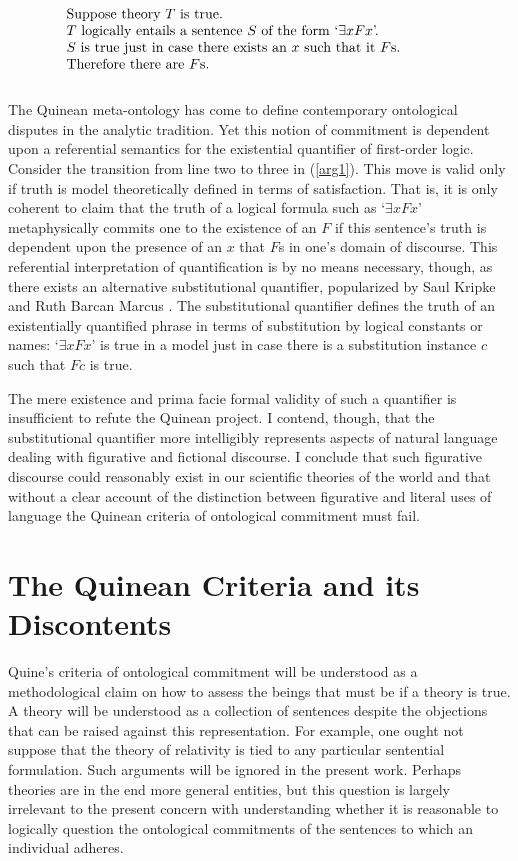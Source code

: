 \documentclass[12pt,a4paper]{article}
\newenvironment{te}
{\begin{singlespace}
\begin{equation}
\begin{minipage}[t]{0.8\linewidth}}
{\end{minipage}
\end{equation}
\end{singlespace}
\ignorespacesafterend}
\begin{document}
\begin{te}
  Suppose theory $T$ is true.\\
  $T$ logically entails a sentence $S$ of the form `$\exists xFx$'.\\
  $S$ is true just in case there exists an $x$ such that it $F$s.\\
  Therefore there are $F$s.\\
\end{te}\label{arg1}

The Quinean meta-ontology has come to define contemporary ontological
disputes in the analytic tradition.  Yet this notion of commitment is
dependent upon a referential semantics for the existential quantifier
of first-order logic.  Consider the transition from line two to three
in (\ref{arg1}). This move is valid only if truth is model
theoretically defined in terms of satisfaction. That is, it is only
coherent to claim that the truth of a logical formula such as
`$\exists xFx$' metaphysically commits one to the existence of an $F$
if this sentence's truth is dependent upon the presence of an $x$ that
$F$s in one's domain of discourse.  This referential interpretation of
quantification is by no means necessary, though, as there exists an
alternative substitutional quantifier, popularized by Saul Kripke
\cite{kripke} and Ruth Barcan Marcus \cite{marcus72}.  The
substitutional quantifier defines the truth of an existentially
quantified phrase in terms of substitution by logical constants or
names: `$\exists xFx$' is true in a model just in case there is a
substitution instance $c$ such that $Fc$ is true.

The mere existence and prima facie formal validity of such a
quantifier is insufficient to refute the Quinean project.  I contend,
though, that the substitutional quantifier more intelligibly
represents aspects of natural language dealing with figurative and
fictional discourse.  I conclude that such figurative discourse could
reasonably exist in our scientific theories of the world and that
without a clear account of the distinction between figurative and
literal uses of language the Quinean criteria of ontological
commitment must fail.


\section{The Quinean Criteria and its Discontents}

Quine's criteria of ontological commitment will be understood as a
methodological claim on how to assess the beings that must be if a
theory is true.  A theory will be understood as a collection of
sentences despite the objections that can be raised against this
representation.  For example, one ought not suppose that the theory of
relativity is tied to any particular sentential formulation. Such
arguments will be ignored in the present work. Perhaps theories are in
the end more general entities, but this question is largely irrelevant
to the present concern with understanding whether it is reasonable to
logically question the ontological commitments of the sentences to
which an individual adheres.
\end{document}
